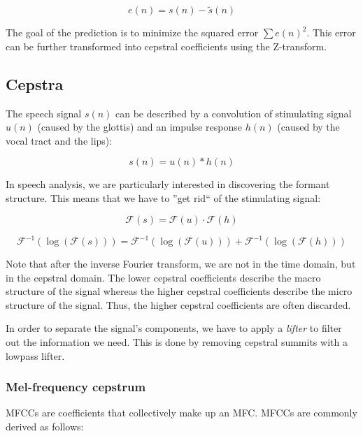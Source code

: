 \documentclass[11pt]{article}
\begin{document}
\begin{equation}
    e(n) = s(n) - \tilde{s}(n)
\end{equation}

The goal of the prediction is to minimize the squared error $\sum e(n)^2$. This error can be further transformed into cepstral coefficients using the Z-transform.

\subsection{Cepstra}

The speech signal $s(n)$ can be described by a convolution of stimulating signal $u(n)$ (caused by the glottis) and an impulse response $h(n)$ (caused by the vocal tract and the lips):

\begin{equation}
    s(n) = u(n) \ast h(n)
\end{equation}

In speech analysis, we are particularly interested in discovering the formant structure. This means that we have to ''get rid`` of the stimulating signal:

\begin{equation}
    \mathcal{F}(s) = \mathcal{F}(u) \cdot \mathcal{F}(h)
\end{equation}

\begin{equation}
    \mathcal{F}^{-1}(\log(\mathcal{F}(s))) = \mathcal{F}^{-1}(\log(\mathcal{F}(u))) + \mathcal{F}^{-1}(\log(\mathcal{F}(h)))
\end{equation}

Note that after the inverse Fourier transform, we are not in the time domain, but in the cepstral domain. The lower cepstral coefficients describe the macro structure of the signal whereas the higher cepstral coefficients describe the micro structure of the signal. Thus, the higher cepstral coefficients are often discarded.

In order to separate the signal's components, we have to apply a \textit{lifter} to filter out the information we need. This is done by removing cepstral summits with a lowpass lifter.

\subsubsection{Mel-frequency cepstrum}

MFCCs are coefficients that collectively make up an MFC. MFCCs are commonly derived as follows:
\end{document}
